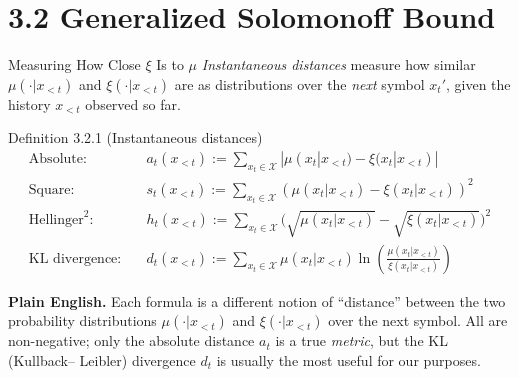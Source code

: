 \documentclass[aspectratio=169,10pt]{beamer}
\newcommand{\X}{\mathcal{X}}
\begin{document}
\section{3.2 Generalized Solomonoff Bound}

\begin{frame}{Measuring How Close $\xi$ Is to $\mu$}
  \emph{Instantaneous distances} measure how similar $\mu(\cdot|x_{<t})$ and
  $\xi(\cdot|x_{<t})$ are as distributions over the \emph{next} symbol
  $x_t'$, given the history $x_{<t}$ observed so far.
  \begin{block}{Definition 3.2.1 (Instantaneous distances)}
    \begin{align*}
      \text{Absolute:} \quad & a_t(x_{<t}) := \sum_{x_t\in\X} |\mu(x_t|x_{<t})-\xi(x_t|x_{<t})| \\
      \text{Square:} \quad & s_t(x_{<t}) := \sum_{x_t\in\X} (\mu(x_t|x_{<t})-\xi(x_t|x_{<t}))^2 \\
      \text{Hellinger}^2\text{:} \quad & h_t(x_{<t}) := \sum_{x_t\in\X} \Big(\sqrt{\mu(x_t|x_{<t})}-\sqrt{\xi(x_t|x_{<t})}\Big)^2 \\
      \text{KL divergence:} \quad & d_t(x_{<t}) := \sum_{x_t\in\X} \mu(x_t|x_{<t}) \ln\!\left(\frac{\mu(x_t|x_{<t})}{\xi(x_t|x_{<t})}\right)
    \end{align*}
  \end{block}
  \textbf{Plain English.} Each formula is a different notion of ``distance''
  between the two probability distributions $\mu(\cdot|x_{<t})$ and
  $\xi(\cdot|x_{<t})$ over the next symbol. All are non-negative; only the
  absolute distance $a_t$ is a true \emph{metric}, but the KL (Kullback--
  Leibler) divergence $d_t$ is usually the most useful for our purposes.
\end{frame}
\end{document}

